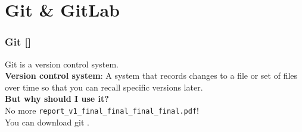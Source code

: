 \documentclass{beamer}
\begin{document}
\section{Git \& GitLab}
\begin{frame}
  \frametitle{Git []}
  Git is a version control system.\\
  \vspace{5mm}
  \textbf{Version control system}: A system that records changes to a file or set of files over time so that you can recall specific versions later.\\
  \vspace{5mm}
  \textbf{But why should I use it?}\\
  No more \texttt{report\_v1\_final\_final\_final\_final.pdf}!\\
  \vspace{5mm}
  You can download git .
\end{frame}
\end{document}
